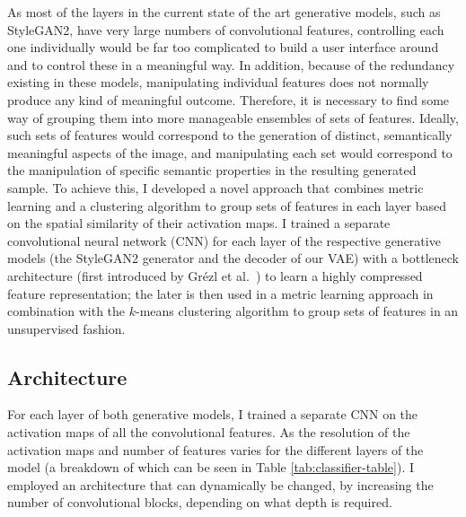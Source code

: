 As most of the layers in the current state of the art generative models, such as StyleGAN2, have very large numbers of convolutional features, controlling each one individually would be far too complicated to build a user interface around and to control these in a meaningful way. 
In addition, because of the redundancy existing in these models, manipulating individual features does not normally produce any kind of meaningful outcome. 
Therefore, it is necessary to find some way of grouping them into more manageable ensembles of sets of features. 
Ideally, such sets of features would correspond to the generation of distinct, semantically meaningful aspects of the image, and manipulating each set would correspond to the manipulation of specific semantic properties in the resulting generated sample. 
To achieve this, I developed a novel approach that combines metric learning and a clustering algorithm to group sets of features in each layer based on the spatial similarity of their activation maps. 
I trained a separate convolutional neural network (CNN) for each layer of the respective generative models (the StyleGAN2 generator and the decoder of our VAE) with a bottleneck architecture (first introduced by Gr{\'e}zl et al.~\citep{grezl2007probabilistic}) to learn a highly compressed feature representation; the later is then used in a metric learning approach in combination with the $k$-means clustering algorithm \citep{lloyd1982least, celebi2013comparative} to group sets of features in an unsupervised fashion. 

\subsection{Architecture}

For each layer of both generative models, I trained a separate CNN on the activation maps of all the convolutional features. 
As the resolution of the activation maps and number of features varies for the different layers of the model (a breakdown of which can be seen in Table \ref{tab:classifier-table}).
I employed an architecture that can dynamically be changed, by increasing the number of convolutional blocks, depending on what depth is required. 


